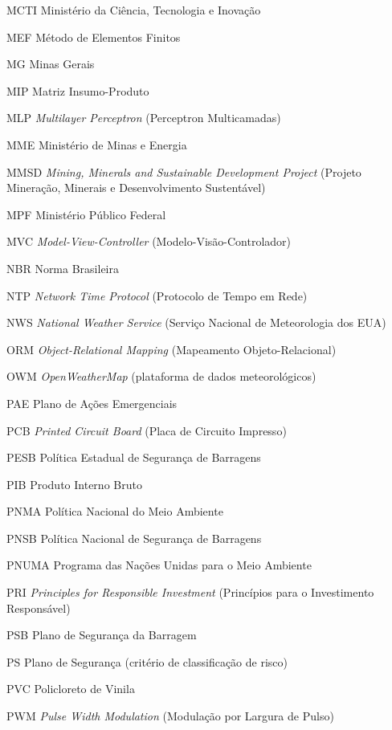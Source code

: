 \begin{siglas}
    \item[MCTI] Ministério da Ciência, Tecnologia e Inovação
    \item[MEF] Método de Elementos Finitos
    \item[MG] Minas Gerais
    \item[MIP] Matriz Insumo-Produto
    \item[MLP] \textit{Multilayer Perceptron} (Perceptron Multicamadas)
    \item[MME] Ministério de Minas e Energia
    \item[MMSD] \textit{Mining, Minerals and Sustainable Development Project} (Projeto Mineração, Minerais e Desenvolvimento Sustentável)
    \item[MPF] Ministério Público Federal
    \item[MVC] \textit{Model-View-Controller} (Modelo-Visão-Controlador)
    \item[NBR] Norma Brasileira
    \item[NTP] \textit{Network Time Protocol} (Protocolo de Tempo em Rede)
    \item[NWS] \textit{National Weather Service} (Serviço Nacional de Meteorologia dos EUA)
    \item[ORM] \textit{Object-Relational Mapping} (Mapeamento Objeto-Relacional)
    \item[OWM] \textit{OpenWeatherMap} (plataforma de dados meteorológicos)
    \item[PAE] Plano de Ações Emergenciais
    \item[PCB] \textit{Printed Circuit Board} (Placa de Circuito Impresso)
    \item[PESB] Política Estadual de Segurança de Barragens
    \item[PIB] Produto Interno Bruto
    \item[PNMA] Política Nacional do Meio Ambiente
    \item[PNSB] Política Nacional de Segurança de Barragens
    \item[PNUMA] Programa das Nações Unidas para o Meio Ambiente
    \item[PRI] \textit{Principles for Responsible Investment} (Princípios para o Investimento Responsável)
    \item[PSB] Plano de Segurança da Barragem
    \item[PS] Plano de Segurança (critério de classificação de risco)
    \item[PVC] Policloreto de Vinila
    \item[PWM] \textit{Pulse Width Modulation} (Modulação por Largura de Pulso)

\end{siglas}
